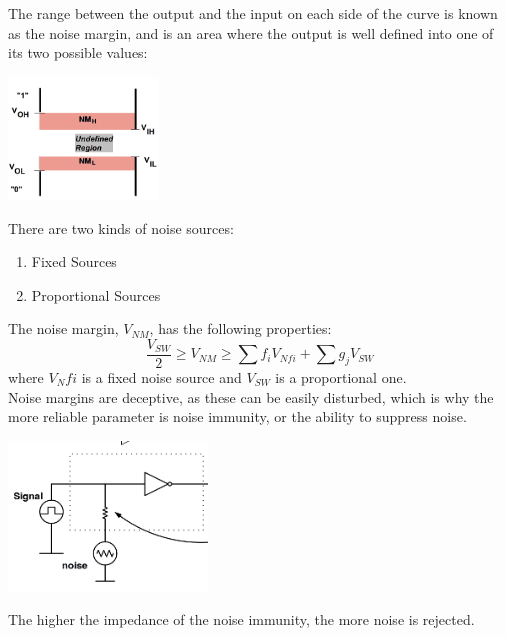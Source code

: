 \documentclass[nobib]{tufte-handout}
\begin{document}
The range between the output and the input on each side of the curve is known as the noise margin, and is an area where the output is well defined into one of its two possible values:
\begin{center}
    \includegraphics[width = 150px]{images/noise_margin.png}
\end{center}
There are two kinds of noise sources:
\begin{enumerate}
    \item Fixed Sources
    \item Proportional Sources
\end{enumerate}
The noise margin, $V_{NM}$, has the following properties:
\begin{equation*}
    \frac{V_{SW}}{2} \geq V_{NM}\geq \sum f_i V_{Nfi}+ \sum g_j V_{SW}
\end{equation*}
where $V_Nfi$ is a fixed noise source and $V_{SW}$ is a proportional one.\\
Noise margins are deceptive, as these can be easily disturbed, which is why the more reliable parameter is noise immunity, or the ability to suppress noise.
\begin{center}
    \includegraphics*[width = 200px]{images/noise_immunity.png}
\end{center}
The higher the impedance of the noise immunity, the more noise is rejected.\\
\end{document}
